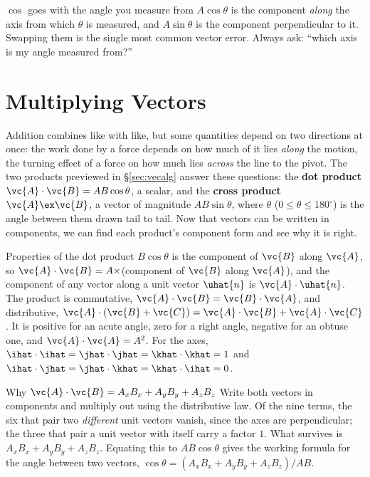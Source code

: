 \begin{trapbox}{$\cos$ goes with the angle you measure from}
$A\cos\theta$ is the component \emph{along} the axis from which $\theta$ is measured, and $A\sin\theta$
is the component perpendicular to it. Swapping them is the single most common vector error. Always ask:
``which axis is my angle measured from?''
\end{trapbox}

\section{Multiplying Vectors}\label{sec:vecprod}

Addition combines like with like, but some quantities depend on two directions at once: the work done
by a force depends on how much of it lies \emph{along} the motion, the turning effect of a force on how
much lies \emph{across} the line to the pivot. The two products previewed in \S\ref{sec:vecalg}
answer these questions: the \textbf{dot product} $\vc{A}\cdot\vc{B}=AB\cos\theta$, a scalar, and the
\textbf{cross product} $\vc{A}\ex\vc{B}$, a vector of magnitude $AB\sin\theta$, where $\theta$
($0\le\theta\le180^\circ$) is the angle between them drawn tail to tail. Now that vectors can be
written in components, we can find each product's component form and see why it is right.

\begin{keybox}{Properties of the dot product}
$B\cos\theta$ is the component of $\vc{B}$ along $\vc{A}$, so $\vc{A}\cdot\vc{B}=A\times$(component of
$\vc{B}$ along $\vc{A}$), and the component of any vector along a unit vector $\uhat{n}$ is
$\vc{A}\cdot\uhat{n}$. The product is commutative, $\vc{A}\cdot\vc{B}=\vc{B}\cdot\vc{A}$, and distributive,
$\vc{A}\cdot(\vc{B}+\vc{C})=\vc{A}\cdot\vc{B}+\vc{A}\cdot\vc{C}$. It is positive for an acute angle, zero
for a right angle, negative for an obtuse one, and $\vc{A}\cdot\vc{A}=A^2$. For the axes,
$\ihat\cdot\ihat=\jhat\cdot\jhat=\khat\cdot\khat=1$ and $\ihat\cdot\jhat=\jhat\cdot\khat=\khat\cdot\ihat=0$.
\end{keybox}

\begin{derivbox}{Why $\vc{A}\cdot\vc{B}=A_xB_x+A_yB_y+A_zB_z$}
Write both vectors in components and multiply out using the distributive law. Of the nine terms, the six
that pair two \emph{different} unit vectors vanish, since the axes are perpendicular; the three that pair
a unit vector with itself carry a factor $1$. What survives is $A_xB_x+A_yB_y+A_zB_z$. Equating this to
$AB\cos\theta$ gives the working formula for the angle between two vectors,
$\cos\theta=(A_xB_x+A_yB_y+A_zB_z)/AB$.
\end{derivbox}

